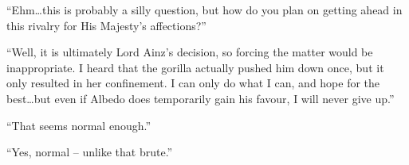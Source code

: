  

“Ehm…this is probably a silly question, but how do you plan on getting ahead in this rivalry for His Majesty’s affections?”

 

“Well, it is ultimately Lord Ainz’s decision, so forcing the matter would be inappropriate. I heard that the gorilla actually pushed him down once, but it only resulted in her confinement. I can only do what I can, and hope for the best…but even if Albedo does temporarily gain his favour, I will never give up.”

 

“That seems normal enough.”

 

“Yes, normal – unlike that brute.”

